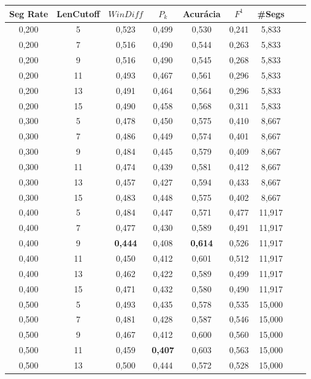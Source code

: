 \documentclass{article}
\begin{document}
\begin{longtable}[c]{|c|c|c|c|c|c|c|c|c|} 
\hline 
 Seg Rate & LenCutoff & $WinDiff$ & $P_k$ & Acurácia & $F^1$ & \#Segs\\ \hline 
 0,200 & 5 & 0,523 & 0,499 & 0,530 & 0,241 & 5,833  \\ \hline 
 0,200 & 7 & 0,516 & 0,490 & 0,544 & 0,263 & 5,833  \\ \hline 
 0,200 & 9 & 0,516 & 0,490 & 0,545 & 0,268 & 5,833  \\ \hline 
 0,200 & 11 & 0,493 & 0,467 & 0,561 & 0,296 & 5,833  \\ \hline 
 0,200 & 13 & 0,491 & 0,464 & 0,564 & 0,296 & 5,833  \\ \hline 
 0,200 & 15 & 0,490 & 0,458 & 0,568 & 0,311 & 5,833  \\ \hline 
 0,300 & 5 & 0,478 & 0,450 & 0,575 & 0,410 & 8,667  \\ \hline 
 0,300 & 7 & 0,486 & 0,449 & 0,574 & 0,401 & 8,667  \\ \hline 
 0,300 & 9 & 0,484 & 0,445 & 0,579 & 0,409 & 8,667  \\ \hline 
 0,300 & 11 & 0,474 & 0,439 & 0,581 & 0,412 & 8,667  \\ \hline 
 0,300 & 13 & 0,457 & 0,427 & 0,594 & 0,433 & 8,667  \\ \hline 
 0,300 & 15 & 0,483 & 0,448 & 0,575 & 0,402 & 8,667  \\ \hline 
 0,400 & 5 & 0,484 & 0,447 & 0,571 & 0,477 & 11,917  \\ \hline 
 0,400 & 7 & 0,477 & 0,430 & 0,589 & 0,491 & 11,917  \\ \hline 
 0,400 & 9 & \cellcolor{gray!20} \textbf{0,444} & 0,408 & \cellcolor{gray!20} \textbf{0,614} & 0,526 & 11,917  \\ \hline 
 0,400 & 11 & 0,450 & 0,412 & 0,601 & 0,512 & 11,917  \\ \hline 
 0,400 & 13 & 0,462 & 0,422 & 0,589 & 0,499 & 11,917  \\ \hline 
 0,400 & 15 & 0,471 & 0,432 & 0,580 & 0,490 & 11,917  \\ \hline 
 0,500 & 5 & 0,493 & 0,435 & 0,578 & 0,535 & 15,000  \\ \hline 
 0,500 & 7 & 0,481 & 0,428 & 0,587 & 0,546 & 15,000  \\ \hline 
 0,500 & 9 & 0,467 & 0,412 & 0,600 & 0,560 & 15,000  \\ \hline 
 0,500 & 11 & 0,459 & \cellcolor{gray!20} \textbf{0,407} & 0,603 & 0,563 & 15,000  \\ \hline 
 0,500 & 13 & 0,500 & 0,444 & 0,572 & 0,528 & 15,000  \\ \hline 

\end{longtable}
\end{document}
